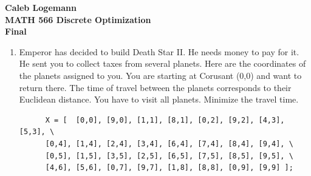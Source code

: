 \documentclass[11pt, oneside]{article}
\begin{document}
\noindent \textbf{\Large{Caleb Logemann \\
MATH 566 Discrete Optimization\\
Final
}}

%
\begin{enumerate}
  \item %
    Emperor has decided to build Death Star II.
    He needs  money to pay for it.
    He sent you to collect taxes from several planets.
    Here are the coordinates of the planets assigned to you.
    You are starting at Corusant (0,0) and want to return there.
    The time of travel between the planets corresponds to their Euclidean
    distance.
    You have to visit all planets.
    Minimize the travel time.
    \begin{verbatim}
      X = [  [0,0], [9,0], [1,1], [8,1], [0,2], [9,2], [4,3], [5,3], \
      [0,4], [1,4], [2,4], [3,4], [6,4], [7,4], [8,4], [9,4], \
      [0,5], [1,5], [3,5], [2,5], [6,5], [7,5], [8,5], [9,5], \
      [4,6], [5,6], [0,7], [9,7], [1,8], [8,8], [0,9], [9,9] ];
    \end{verbatim}


\end{enumerate}
\end{document}
